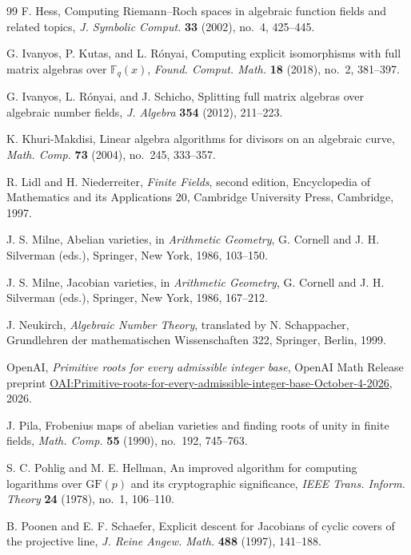 \begin{thebibliography}{99}
F. Hess, Computing Riemann--Roch spaces in algebraic function fields and
related topics, \emph{J. Symbolic Comput.} \textbf{33} (2002), no.~4,
425--445.

G. Ivanyos, P. Kutas, and L. R\'onyai,
Computing explicit isomorphisms with full matrix algebras over
$\mathbb F_q(x)$, \emph{Found. Comput. Math.} \textbf{18} (2018), no.~2,
381--397.

G. Ivanyos, L. R\'onyai, and J. Schicho,
Splitting full matrix algebras over algebraic number fields,
\emph{J. Algebra} \textbf{354} (2012), 211--223.

K. Khuri-Makdisi, Linear algebra algorithms for divisors on an algebraic
curve, \emph{Math. Comp.} \textbf{73} (2004), no.~245, 333--357.

R. Lidl and H. Niederreiter, \emph{Finite Fields}, second edition,
Encyclopedia of Mathematics and its Applications 20,
Cambridge University Press, Cambridge, 1997.

J. S. Milne, Abelian varieties,
in \emph{Arithmetic Geometry}, G. Cornell and J. H. Silverman (eds.),
Springer, New York, 1986, 103--150.

J. S. Milne, Jacobian varieties,
in \emph{Arithmetic Geometry}, G. Cornell and J. H. Silverman (eds.),
Springer, New York, 1986, 167--212.

J. Neukirch, \emph{Algebraic Number Theory},
translated by N. Schappacher,
Grundlehren der mathematischen Wissenschaften 322,
Springer, Berlin, 1999.

OpenAI, \emph{Primitive roots for every admissible integer base},
OpenAI Math Release preprint
\href{https://github.com/openai/math/blob/main/preprints/Primitive-roots-for-every-admissible-integer-base-October-4-2026/primitive-roots-all-integer-bases.pdf}{OAI:Primitive-roots-for-every-admissible-integer-base-October-4-2026},
2026.

J. Pila, Frobenius maps of abelian varieties and finding roots of unity in
finite fields, \emph{Math. Comp.} \textbf{55} (1990), no.~192, 745--763.

S. C. Pohlig and M. E. Hellman,
An improved algorithm for computing logarithms over $\mathrm{GF}(p)$ and
its cryptographic significance,
\emph{IEEE Trans. Inform. Theory} \textbf{24} (1978), no.~1, 106--110.

B. Poonen and E. F. Schaefer,
Explicit descent for Jacobians of cyclic covers of the projective line,
\emph{J. Reine Angew. Math.} \textbf{488} (1997), 141--188.


\end{thebibliography}
